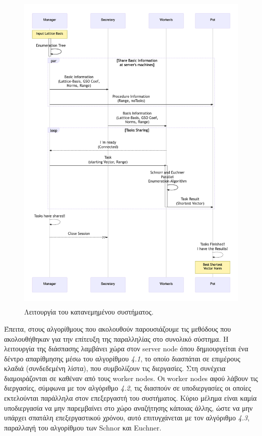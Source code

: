 \begin{figure}[!htbp]
\centering
\includegraphics[width=0.8\linewidth,height=16cm]{pictures/SystemAnalysis.png}
\caption{Λειτουργία του κατανεμημένου συστήματος.}
\label{fig:system}       
\end{figure}

Έπειτα, στους αλγορίθμους που ακολουθούν παρουσιάζουμε τις μεθόδους που ακολουθήθηκαν για την επίτευξη της παραλληλίας στο συνολικό σύστημα. Η λειτουργία της διάσπασης λαμβάνει χώρα στον server node όπου δημιουργείται ένα δέντρο απαρίθμησης μέσω του αλγορίθμου \emph{4.1}, το οποίο διασπάται σε επιμέρους κλαδιά (συνδεδεμένη λίστα), που συμβολίζουν τις διεργασίες. Στη συνέχεια διαμοιράζονται σε καθέναν από τους worker nodes. Οι worker nodes αφού λάβουν τις διεργασίες, σύμφωνα με τον αλγόριθμο \emph{4.2}, τις διασπούν σε υποδιεργασίες  οι οποίες εκτελούνται παράλληλα στον επεξεργαστή του συστήματος. Κύριο μέλημα είναι καμία υποδιεργασία να μην παρεμβαίνει στο χώρο αναζήτησης κάποιας άλλης, ώστε να μην υπάρχει σπατάλη επεξεργαστικού χρόνου, αυτό επιτυγχάνεται με τον αλγόριθμο \emph{4.3}, παραλλαγή του αλγορίθμου των Schnor και Euchner\cite{journals/mp/SchnorrE94}.

